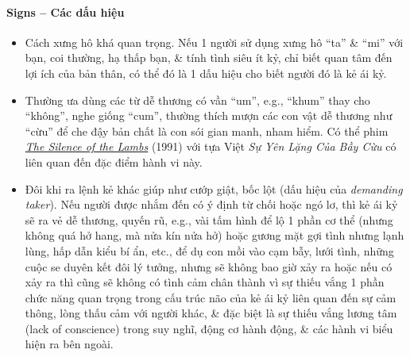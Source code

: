 \documentclass[12pt]{article}
\begin{document}
\paragraph{Signs -- Các dấu hiệu}
\begin{itemize}
	\item Cách xưng hô khá quan trọng. Nếu 1 người sử dụng xưng hô ``ta'' \& ``mi'' với bạn, coi thường, hạ thấp bạn, \& tính tình siêu ít kỷ, chỉ biết quan tâm đến lợi ích của bản thân, có thể đó là 1 dấu hiệu cho biết người đó là kẻ ái kỷ.
	\item Thường ưa dùng các từ dễ thương có vần ``um'', e.g., ``khum'' thay cho ``không'', nghe giống ``cum'', thường thích mượn các con vật dễ thương như ``cừu'' để che đậy bản chất là con sói gian manh, nham hiểm. Có thể phim \href{https://www.imdb.com/title/tt0102926}{\it The Silence of the Lambs} (1991) với tựa Việt {\it Sự Yên Lặng Của Bầy Cừu} có liên quan đến đặc điểm hành vi này.
	\item Đôi khi ra lệnh kẻ khác giúp như cướp giật, bốc lột (dấu hiệu của {\it demanding taker}). Nếu người được nhắm đến có ý định từ chối hoặc ngó lơ, thì kẻ ái kỷ sẽ ra vẻ dễ thương, quyến rũ, e.g., vài tấm hình để lộ 1 phần cơ thể (nhưng không quá hở hang, mà nửa kín nửa hở) hoặc gương mặt gợi tình nhưng lạnh lùng, hấp dẫn kiểu bí ẩn, etc., để dụ con mồi vào cạm bẫy, lưới tình, những cuộc se duyên kết đôi lý tưởng, nhưng sẽ không bao giờ xảy ra hoặc nếu có xảy ra thì cũng sẽ không có tình cảm chân thành vì sự thiếu vắng 1 phần chức năng quan trọng trong cấu trúc não của kẻ ái kỷ liên quan đến sự cảm thông, lòng thấu cảm với người khác, \& đặc biệt là sự thiếu vắng lương tâm (lack of conscience) trong suy nghĩ, động cơ hành động, \& các hành vi biểu hiện ra bên ngoài.
\end{itemize}
\end{document}
